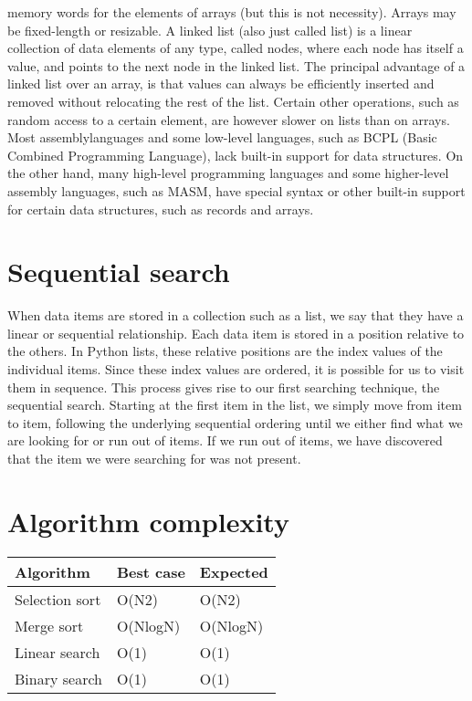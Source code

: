 \documentclass{article}
\begin{document}
memory words for the elements of arrays (but this is 
not necessity). Arrays may be fixed-length or 
resizable. A linked list (also just called list) is a linear 
collection of data elements of any type, called nodes, 
where each node has itself a value, and points to the 
next node in the linked list. The principal advantage 
of a linked list over an array, is that values can always 
be efficiently inserted and removed without relocating 
the rest of the list. Certain other operations, such as 
random access to a certain element, are however 
slower on lists than on arrays. Most assemblylanguages and some low-level languages, such as 
BCPL (Basic Combined Programming Language), 
lack built-in support for data structures. On the other 
hand, many high-level programming languages and 
some higher-level assembly languages, such as 
MASM, have special syntax or other built-in support 
for certain data structures, such as records and arrays.
\section*{Sequential search}When data items are stored in a collection such as a 
list, we say that they have a linear or sequential 
relationship. Each data item is stored in a position 
relative to the others. In Python lists, these relative 
positions are the index values of the individual items. 
Since these index values are ordered, it is possible for 
us to visit them in sequence. This process gives rise to 
our first searching technique, the sequential search. 
Starting at the first item in the list, we simply move 
from item to item, following the underlying sequential 
ordering until we either find what we are looking for 
or run out of items. If we run out of items, we have 
discovered that the item we were searching for was 
not present.

\begin{table}
\section*{Algorithm complexity}
\begin{center}

    \centering
    \begin{tabular}{ | m{10em} | m{10em}| m{10em} | } 
    \hline
         Algorithm & Best case & Expected \\
         \hline
         Selection sort & O(N2) & O(N2)\\
         \hline
         Merge sort & O(NlogN) & O(NlogN)\\
         \hline
         Linear search & O(1) & O(1)\\
         \hline
         Binary search & O(1) & O(1)\\
         \hline


    \end{tabular}

    \label{tab:my_label}
    \end{center}
\end{table}
\end{document}
